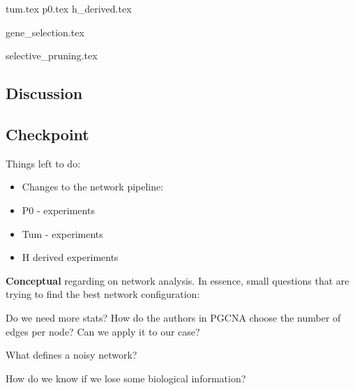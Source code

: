 {tum.tex}
\newpage
{p0.tex}
\newpage
{h_derived.tex}
\newpage

{gene_selection.tex}
\newpage

\newpage
{selective_pruning.tex}

\newpage

\subsection{Discussion}


\subsection{Checkpoint}


Things left to do:
\begin{itemize}
    \item Changes to the network pipeline:
    \item P0 - experiments
    \item Tum - experiments
    \item H derived experiments
\end{itemize}
\vspace{1cm}
\textbf{Conceptual} regarding on network analysis. In essence, small questions that are trying to find the best network configuration:
\begin{todolist}
    \item Do we need more stats? How do the authors in PGCNA choose the number of edges per node? Can we apply it to our case?
    \item What defines a noisy network?
    \item How do we know if we lose some biological information?
\end{todolist}